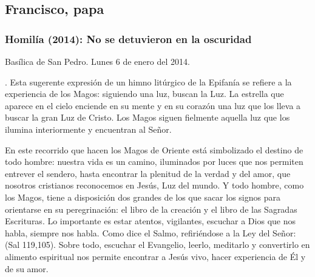 \begin{body}
\begin{body}
{\subsection{Francisco, papa}

\subsubsection{Homilía (2014): No se detuvieron en la oscuridad}

Basílica de San Pedro. Lunes 6 de enero del 2014.

. Esta sugerente expresión de un himno litúrgico de la Epifanía se refiere a la experiencia de los Magos: siguiendo una luz, buscan la Luz. La estrella que aparece en el cielo enciende en su mente y en su corazón una luz que los lleva a buscar la gran Luz de Cristo. Los Magos siguen fielmente aquella luz que los ilumina interiormente y encuentran al Señor.

En este recorrido que hacen los Magos de Oriente está simbolizado el destino de todo hombre: nuestra vida es un camino, iluminados por luces que nos permiten entrever el sendero, hasta encontrar la plenitud de la verdad y del amor, que nosotros cristianos reconocemos en Jesús, Luz del mundo. Y todo hombre, como los Magos, tiene a disposición dos grandes  de los que sacar los signos para orientarse en su peregrinación: el libro de la creación y el libro de las Sagradas Escrituras. Lo importante es estar atentos, vigilantes, escuchar a Dios que nos habla, siempre nos habla. Como dice el Salmo, refiriéndose a la Ley del Señor:  (Sal 119,105). Sobre todo, escuchar el Evangelio, leerlo, meditarlo y convertirlo en alimento espiritual nos permite encontrar a Jesús vivo, hacer experiencia de Él y de su amor.

}
\end{body}
\end{body}
